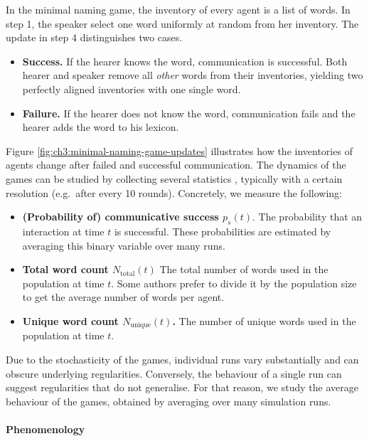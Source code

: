 \documentclass{../src/bcthesispart}
\begin{document}
In the minimal naming game, the inventory of every agent is a list of words.
In step 1, the speaker select one word uniformly at random from her inventory.
The update in step 4 distinguishes two cases.
\begin{itemize}
	\item \textbf{Success.} 
	If the hearer knows the word, communication is successful. Both hearer and speaker remove all \emph{other} words from their inventories, yielding two perfectly aligned inventories with one single word.
	
	\item \textbf{Failure.} 
	If the hearer does not know the word, communication fails and the hearer adds the word to his lexicon.
\end{itemize}
Figure \ref{fig:ch3:minimal-naming-game-updates} illustrates how the inventories of agents change after failed and successful communication.
The dynamics of the games can be studied by collecting several statistics \parencite[cf.][]{Baronchelli2017,Wellens2012}, typically with a certain resolution (e.g.\ after every 10 rounds).
Concretely, we measure the following:
\begin{itemize}
	\item \textbf{(Probability of) communicative success $p_s(t)$}.
		The probability that an interaction at time $t$ is successful. These probabilities are estimated by averaging this binary variable over many runs.
		
	\item \textbf{Total word count $N_{\text{total}}(t)$} 
		The total number of words used in the population at time $t$.
		Some authors prefer to divide it by the population size to get the average number of words per agent.
		
	\item \textbf{Unique word count $N_{\text{unique}}(t)$.} 
		The number of unique words used in the population at time $t$.
\end{itemize}
Due to the stochasticity of the games, individual runs vary substantially and can obscure underlying regularities.
Conversely, the behaviour of a single run can suggest regularities that do not generalise.
For that reason, we study the average behaviour of the games, obtained by averaging over many simulation runs.




\paragraph{Phenomenology}
\end{document}

